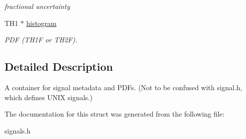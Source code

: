 \begin{DoxyCompactItemize}
\begin{DoxyCompactList}\small\item\em fractional uncertainty \item\end{DoxyCompactList}\item 
\hypertarget{structSignal_a0fb6b6acb6d4224105f776925da00747}{
TH1 $\ast$ \hyperlink{structSignal_a0fb6b6acb6d4224105f776925da00747}{histogram}}
\label{structSignal_a0fb6b6acb6d4224105f776925da00747}

\begin{DoxyCompactList}\small\item\em PDF (TH1F or TH2F). \item\end{DoxyCompactList}\end{DoxyCompactItemize}


\subsection{Detailed Description}
A container for signal metadata and PDFs. (Not to be confused with signal.h, which defines UNIX signals.) 

The documentation for this struct was generated from the following file:\begin{DoxyCompactItemize}
\item 
signals.h\end{DoxyCompactItemize}
